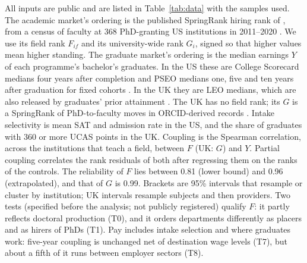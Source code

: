 All inputs are public and are listed in Table~\ref{tab:data} with the samples used. The academic market's
ordering is the published SpringRank hiring rank of \citet{wapman2022quantifying}, from a census of faculty at 368
PhD-granting US institutions in 2011--2020 \citep{wapman2022data}. We use its field rank $F_{if}$ and its
university-wide rank $G_i$, signed so that higher values mean higher standing. The graduate market's ordering is
the median earnings $Y$ of each programme's bachelor's graduates. In the US these are College Scorecard medians four
years after completion \citep{scorecard} and PSEO medians one, five and ten years after graduation for fixed
cohorts \citep{pseo, pseo2026}. In the UK they are LEO medians, which are also released by graduates' prior
attainment \citep{dfe_leo_provider}. The UK has no field rank; its $G$ is a SpringRank of PhD-to-faculty moves in
ORCID-derived records \citep{li2026orcid}. Intake selectivity is mean SAT and admission rate in the US, and the
share of graduates with 360 or more UCAS points in the UK. Coupling is the Spearman correlation, across the
institutions that teach a field, between $F$ (UK: $G$) and $Y$. Partial coupling correlates the rank residuals of
both after regressing them on the ranks of the controls. The reliability of $F$ lies between 0.81 (lower bound)
and 0.96 (extrapolated), and that of $G$ is 0.99. Brackets are 95\% intervals that resample or cluster by
institution; UK intervals resample subjects and then providers. Two tests (specified before the analysis; not
publicly registered) qualify $F$: it partly reflects doctoral production (T0), and it orders departments
differently as placers and as hirers of PhDs (T1). Pay includes intake selection and where graduates work:
five-year coupling is unchanged net of destination wage levels (T7), but about a fifth of it runs between employer
sectors (T8).

